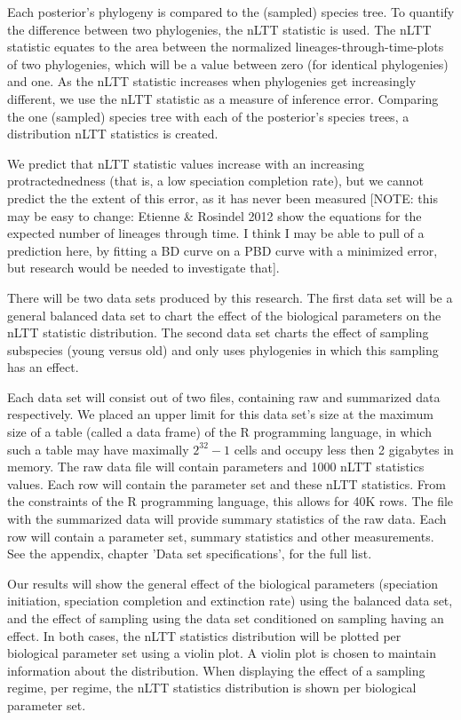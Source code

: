 \documentclass{article}
\begin{document}
Each posterior's phylogeny is compared to the (sampled) species tree.
To quantify the difference between two phylogenies, the nLTT statistic
is used. The nLTT statistic equates to the area between the normalized
lineages-through-time-plots of two phylogenies, which will be a value between 
zero (for identical phylogenies) and one. As the nLTT statistic increases
when phylogenies get increasingly different, we use the nLTT statistic
as a measure of inference error. Comparing the one (sampled) species tree
with each of the posterior's species trees, a distribution nLTT statistics
is created. 

We predict that nLTT statistic values increase 
with an increasing protractednedness (that is, a low speciation completion rate),
but we cannot predict the the extent of this error, as it has never been 
measured [NOTE: this may be easy to change: Etienne \& Rosindel 2012 show the equations
for the expected number of lineages through time. I think I may be able to pull
of a prediction here, by fitting a BD curve on a PBD curve with a minimized error,
but research would be needed to investigate that].

There will be two data sets produced by this research.
The first data set will be a general balanced data set to chart
the effect of the biological parameters on the nLTT statistic
distribution. The second data set charts the effect of sampling
subspecies (young versus old) and only uses phylogenies in which this sampling
has an effect.

Each data set will consist out of two files, containing raw and summarized 
data respectively. We placed 
an upper limit for this data set's size at the maximum size of a table (called 
a data frame) of the R programming language, in which such a table may 
have maximally $2^{32}-1$ cells and occupy less then 2 gigabytes in memory.
The raw data file will contain parameters and 1000 nLTT statistics values.
Each row will contain the parameter set and these nLTT statistics.
From the constraints of the R programming language, this allows for 40K rows. 
The file with the summarized data will provide summary statistics of the raw
data. Each row will contain a parameter set, summary statistics and other
measurements. See the appendix, chapter 'Data set specifications', for the full list.

Our results will show the general effect of the biological parameters (speciation initiation, 
speciation completion and extinction rate) using the balanced data set,
and the effect of sampling using the data set conditioned on sampling having an effect.
In both cases, the nLTT statistics distribution will be plotted per
biological parameter set using a violin plot. A violin plot is chosen to
maintain information about the distribution. When displaying the effect of a 
sampling regime, per regime, the nLTT statistics distribution is shown per
biological parameter set.
\end{document}
